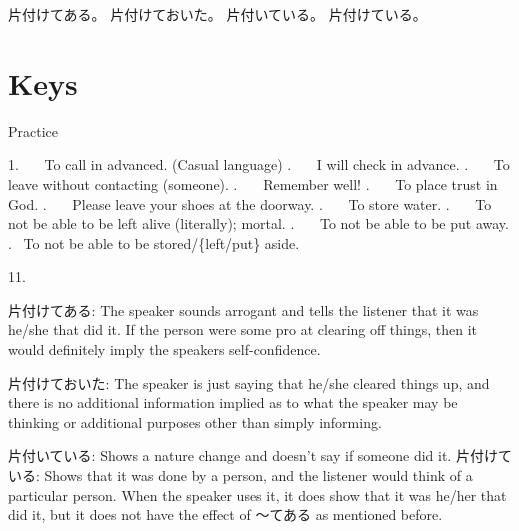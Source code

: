 \par{片付けてある。 \hfill\break
片付けておいた。 \hfill\break
片付いている。 \hfill\break
片付けている。 }
      
\section{Keys}
 
\par{Practice }

\par{1.    To call in advanced. (Casual language) \hfill{}.    I will check in advance. \hfill{}.    To leave without contacting (someone). \hfill{}.    Remember well! \hfill{}.    To place trust in God. \hfill{}.    Please leave your shoes at the doorway. \hfill{}.    To store water. \hfill{}.    To not be able to be left alive (literally); mortal. \hfill{}.    To not be able to be put away. \hfill{}.  To not be able to be stored\slash \{left\slash put\} aside. }

\par{11. }

\par{片付けてある: The speaker sounds arrogant and tells the listener that it was he\slash she that did it. If the person were some pro at clearing off things, then it would definitely imply the speaker\textquotesingle s self-confidence. }

\par{片付けておいた: The speaker is just saying that he\slash she cleared things up, and there is no additional information implied as to what the speaker may be thinking or additional purposes other than simply informing. }

\par{片付いている: Shows a nature change and doesn't say if someone did it. \hfill\break
\hfill\break
片付けている: Shows that it was done by a person, and the listener would think of a particular person. When the speaker uses it, it does show that it was he\slash her that did it, but it does not have the effect of ～てある as mentioned before. }
    